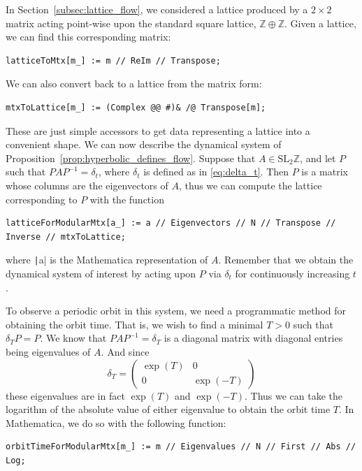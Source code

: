 \documentclass[12pt,twoside]{reedthesis}
\theoremstyle{definition}
\newcommand{\Z}{\mathbb{Z}}
\newcommand{\SLZ}{\mathrm{SL}_2{\Z}}
\begin{document}
In Section~\ref{subsec:lattice_flow}, we considered a lattice produced by a $2 \times 2$ matrix acting point-wise upon the standard square lattice, $\Z \oplus \Z$.
Given a lattice, we can find this corresponding matrix:
\begin{verbatim}
latticeToMtx[m_] := m // ReIm // Transpose;
\end{verbatim}
We can also convert back to a lattice from the matrix form:
\begin{verbatim}
mtxToLattice[m_] := (Complex @@ #)& /@ Transpose[m];
\end{verbatim}
These are just simple accessors to get data representing a lattice into a convenient shape.
We can now describe the dynamical system of Proposition~\ref{prop:hyperbolic_defines_flow}.
Suppose that $A \in \SLZ$, and let $P$ such that $PAP^{-1} = \delta_t$, where $\delta_t$ is defined as in \eqref{eq:delta_t}.
Then $P$ is a matrix whose columns are the eigenvectors of $A$, thus we can compute the lattice corresponding to $P$ with the function 
\begin{verbatim}
latticeForModularMtx[a_] := a // Eigenvectors // N // Transpose // Inverse // mtxToLattice;
\end{verbatim}
where \texttt|a| is the Mathematica representation of $A$.
Remember that we obtain the dynamical system of interest by acting upon $P$ via $\delta_t$ for continuously increasing $t$.

To observe a periodic orbit in this system, we need a programmatic method for obtaining the orbit time.
That is, we wish to find a minimal $T > 0$ such that $\delta_T P = P$.
We know that $PAP^{-1} = \delta_T$ is a diagonal matrix with diagonal entries being eigenvalues of $A$.
And since
\begin{equation*}
  \delta_T = \begin{pmatrix}
    \exp(T) & 0 \\
    0 & \exp(-T)
  \end{pmatrix}
\end{equation*}
these eigenvalues are in fact $\exp(T)$ and $\exp(-T)$.
Thus we can take the logarithm of the absolute value of either eigenvalue to obtain the orbit time $T$.
In Mathematica, we do so with the following function:
\begin{verbatim}
orbitTimeForModularMtx[m_] := m // Eigenvalues // N // First // Abs // Log;
\end{verbatim}
\end{document}
